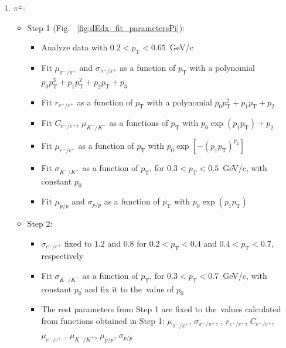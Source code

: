 \begin{enumerate}
	\item  $\pi^{\pm}$:
		\begin{itemize}
			\item Step 1 (Fig. ~\ref{fig:dEdx_fit_parametersPi}):
			\begin{itemize}
				\renewcommand\labelitemi{--}
				\item Analyze data with $0.2 < p_\textrm{T} < 0.65$~GeV/c
				\item Fit  $\mu_{\pi^-/\pi^+}$ and $\sigma_{\pi^-/\pi^+}$ as a function of $p_\textrm{T}$ with a polynomial  $p_0p_\textrm{T}^3+p_1p_\textrm{T}^2+p_2p_\textrm{T}+p_3$
				\item Fit $r_{e^-/e^+}$ as a function of $p_\textrm{T}$ with a polynomial $p_0p_\textrm{T}^2+p_1p_\textrm{T}+p_2$
				\item Fit  $C_{e^-/e^+}$, $\mu_{K^-/K^+}$ as a functions of $p_\textrm{T}$ with $p_0\exp\left(p_1p_\textrm{T}\right)+p_2$
				\item Fit  $\mu_{e^-/e^+}$ as a function of $p_\textrm{T}$ with $p_0\exp\left[-\left(p_1p_\textrm{T}\right)^{p_2}\right]$ 
				\item Fit $\sigma_{K^-/K^+}$ as a function of $p_\textrm{T}$, for $0.3<p_\textrm{T}<0.5$~GeV/c, with constant $p_0$ 
				\item Fit  $\mu_{\bar{p}/p}$ and $\sigma_{\bar{p}/p}$ as a function of $p_\textrm{T}$ with $p_0\exp\left(p_1p_\textrm{T}\right)$
			\end{itemize}
			\item Step 2:
				\begin{itemize}
					\renewcommand\labelitemi{--}
					\item $\sigma_{e^-/e^+}$ fixed to $1.2$ and $0.8$ for $0.2<p_\textrm{T}<0.4$ and $0.4<p_\textrm{T}<0.7$, respectively
					\item Fit $\sigma_{K^-/K^+}$ as a function of $p_\textrm{T}$, for $0.3<p_\textrm{T}<0.7$~GeV/c, with constant $p_0$ and fix it to the~value of $p_0$
					\item  The rest parameters from Step 1 are fixed to the~values calculated from functions obtained in Step 1: $\mu_{\pi^-/\pi^+}$, $\sigma_{\pi^-/\pi^+}$, , $r_{e^-/e^+}$, $C_{e^-/e^+}$, $\mu_{e^-/e^+}$ , $\mu_{K^-/K^+}$, $\mu_{\bar{p}/p}$, $\sigma_{\bar{p}/p}$
				\end{itemize}	
		\end{itemize}		
\end{enumerate} 

